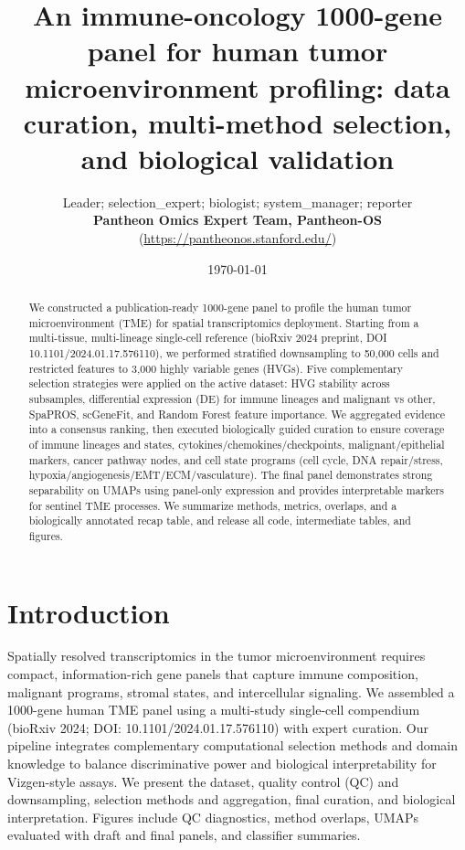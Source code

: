 \documentclass[11pt]{article}
\title{An immune-oncology 1000-gene panel for human tumor microenvironment profiling: data curation, multi-method selection, and biological validation}
\author{Leader; selection\_expert; biologist; system\_manager; reporter \\ \textbf{Pantheon Omics Expert Team, Pantheon-OS} (\url{https://pantheonos.stanford.edu/})}
\date{\today}
\begin{document}
\maketitle

\begin{abstract}
We constructed a publication-ready 1000-gene panel to profile the human tumor microenvironment (TME) for spatial transcriptomics deployment. Starting from a multi-tissue, multi-lineage single-cell reference (bioRxiv 2024 preprint, DOI 10.1101/2024.01.17.576110), we performed stratified downsampling to 50{,}000 cells and restricted features to 3{,}000 highly variable genes (HVGs). Five complementary selection strategies were applied on the active dataset: HVG stability across subsamples, differential expression (DE) for immune lineages and malignant vs other, SpaPROS, scGeneFit, and Random Forest feature importance. We aggregated evidence into a consensus ranking, then executed biologically guided curation to ensure coverage of immune lineages and states, cytokines/chemokines/checkpoints, malignant/epithelial markers, cancer pathway nodes, and cell state programs (cell cycle, DNA repair/stress, hypoxia/angiogenesis/EMT/ECM/vasculature). The final panel demonstrates strong separability on UMAPs using panel-only expression and provides interpretable markers for sentinel TME processes. We summarize methods, metrics, overlaps, and a biologically annotated recap table, and release all code, intermediate tables, and figures.
\end{abstract}

\section{Introduction}
Spatially resolved transcriptomics in the tumor microenvironment requires compact, information-rich gene panels that capture immune composition, malignant programs, stromal states, and intercellular signaling. We assembled a 1000-gene human TME panel using a multi-study single-cell compendium (bioRxiv 2024; DOI: 10.1101/2024.01.17.576110) with expert curation. Our pipeline integrates complementary computational selection methods and domain knowledge to balance discriminative power and biological interpretability for Vizgen-style assays. We present the dataset, quality control (QC) and downsampling, selection methods and aggregation, final curation, and biological interpretation. Figures include QC diagnostics, method overlaps, UMAPs evaluated with draft and final panels, and classifier summaries.
\end{document}
